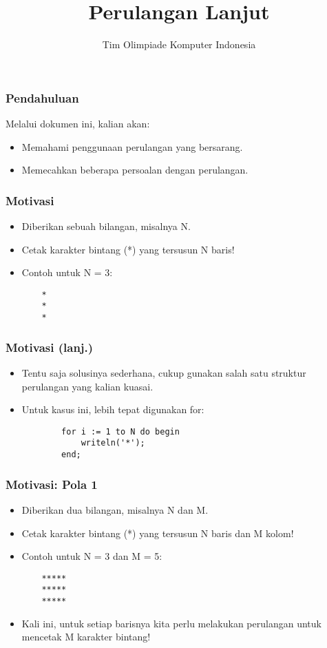 \documentclass{beamer}
\title{Perulangan Lanjut}
\author{Tim Olimpiade Komputer Indonesia}
\begin{document}
\begin{frame}
\titlepage
\end{frame}

\begin{frame}
\frametitle{Pendahuluan}
Melalui dokumen ini, kalian akan:
\begin{itemize}
	\item Memahami penggunaan perulangan yang bersarang.
	\item Memecahkan beberapa persoalan dengan perulangan.
\end{itemize}
\end{frame}

\begin{frame}[fragile]
\frametitle{Motivasi}
\begin{itemize}
	\item Diberikan sebuah bilangan, misalnya N.
	\item Cetak karakter bintang (*) yang tersusun N baris!
	
	\item Contoh untuk N = 3:
	\begin{lstlisting}
	*
	*
	*
	\end{lstlisting}
\end{itemize}
\end{frame}

\begin{frame}[fragile]
\frametitle{Motivasi (lanj.)}
\begin{itemize}
	\item Tentu saja solusinya sederhana, cukup gunakan salah satu struktur perulangan yang kalian kuasai.
	\item Untuk kasus ini, lebih tepat digunakan for:
	\begin{lstlisting}
		for i := 1 to N do begin
		    writeln('*');
		end;
	\end{lstlisting}	
\end{itemize}
\end{frame}

\begin{frame}[fragile]
\frametitle{Motivasi: Pola 1}
\begin{itemize}
	\item Diberikan dua bilangan, misalnya N dan M.
	\item Cetak karakter bintang (*) yang tersusun N baris dan M kolom!
	
	\item Contoh untuk N = 3 dan M = 5:
	\begin{lstlisting}
	*****
	*****
	*****
	\end{lstlisting}
	
	\item Kali ini, untuk setiap barisnya kita perlu melakukan perulangan untuk mencetak M karakter bintang!
\end{itemize}
\end{frame}
\end{document}
